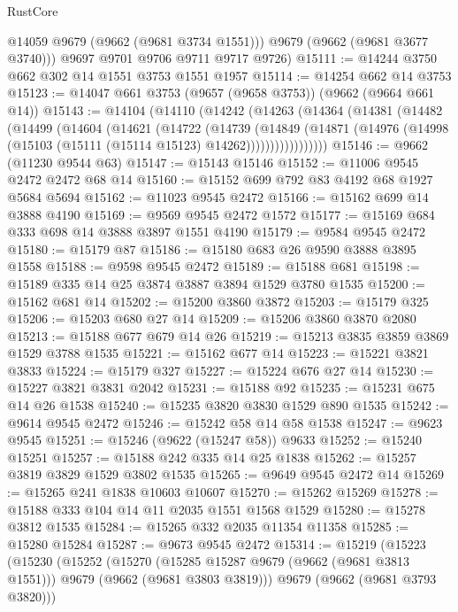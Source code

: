 \begin{lexlean}{RustCore}
\begin{coremodule}
          @14059
          @9679
          (@9662 (@9681 @3734 @1551)))
        @9679
        (@9662 (@9681 @3677 @3740)))
      @9697
      @9701
      @9706
      @9711
      @9717
      @9726)
@15111 := @14244 @3750 @662 @302 @14 @1551 @3753 @1551 @1957
@15114 := @14254 @662 @14 @3753
@15123 := @14047 @661 @3753 (@9657 (@9658 @3753)) (@9662 (@9664 @661 @14))
@15143 := @14104
    (@14110
      (@14242
        (@14263
          (@14364
            (@14381
              (@14482
                (@14499
                  (@14604
                    (@14621
                      (@14722
                        (@14739
                          (@14849
                            (@14871
                              (@14976
                                (@14998 (@15103 (@15111 (@15114 @15123) @14262)))))))))))))))))
@15146 := @9662 (@11230 @9544 @63)
@15147 := @15143 @15146
@15152 := @11006 @9545 @2472 @2472 @68 @14
@15160 := @15152 @699 @792 @83 @4192 @68 @1927 @5684 @5694
@15162 := @11023 @9545 @2472
@15166 := @15162 @699 @14 @3888 @4190
@15169 := @9569 @9545 @2472 @1572
@15177 := @15169 @684 @333 @698 @14 @3888 @3897 @1551 @4190
@15179 := @9584 @9545 @2472
@15180 := @15179 @87
@15186 := @15180 @683 @26 @9590 @3888 @3895 @1558
@15188 := @9598 @9545 @2472
@15189 := @15188 @681
@15198 := @15189 @335 @14 @25 @3874 @3887 @3894 @1529 @3780 @1535
@15200 := @15162 @681 @14
@15202 := @15200 @3860 @3872
@15203 := @15179 @325
@15206 := @15203 @680 @27 @14
@15209 := @15206 @3860 @3870 @2080
@15213 := @15188 @677 @679 @14 @26
@15219 := @15213 @3835 @3859 @3869 @1529 @3788 @1535
@15221 := @15162 @677 @14
@15223 := @15221 @3821 @3833
@15224 := @15179 @327
@15227 := @15224 @676 @27 @14
@15230 := @15227 @3821 @3831 @2042
@15231 := @15188 @92
@15235 := @15231 @675 @14 @26 @1538
@15240 := @15235 @3820 @3830 @1529 @890 @1535
@15242 := @9614 @9545 @2472
@15246 := @15242 @58 @14 @58 @1538
@15247 := @9623 @9545
@15251 := @15246 (@9622 (@15247 @58)) @9633
@15252 := @15240 @15251
@15257 := @15188 @242 @335 @14 @25 @1838
@15262 := @15257 @3819 @3829 @1529 @3802 @1535
@15265 := @9649 @9545 @2472 @14
@15269 := @15265 @241 @1838 @10603 @10607
@15270 := @15262 @15269
@15278 := @15188 @333 @104 @14 @11 @2035 @1551 @1568 @1529
@15280 := @15278 @3812 @1535
@15284 := @15265 @332 @2035 @11354 @11358
@15285 := @15280 @15284
@15287 := @9673 @9545 @2472
@15314 := @15219
    (@15223
      (@15230
        (@15252
          (@15270
            (@15285 @15287 @9679 (@9662 (@9681 @3813 @1551)))
            @9679
            (@9662 (@9681 @3803 @3819)))
          @9679
          (@9662 (@9681 @3793 @3820)))

\end{coremodule}
\end{lexlean}

